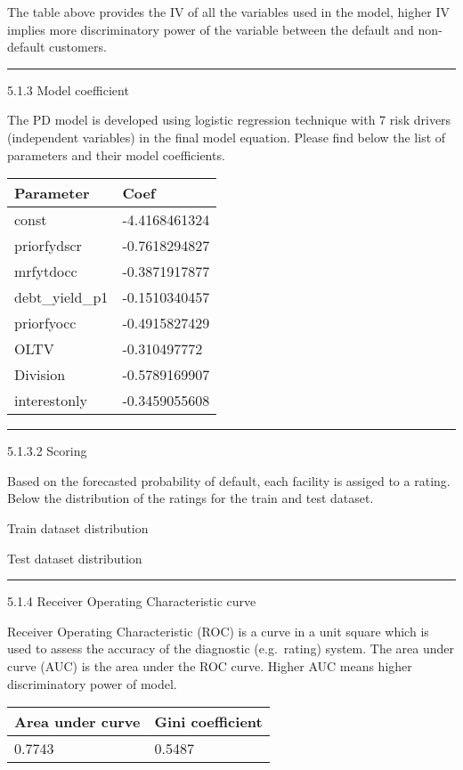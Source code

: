 The table above provides the IV of all the variables used in the model,
higher IV implies more discriminatory power of the variable between the
default and non-default customers.

\begin{center}\rule{0.5\linewidth}{\linethickness}\end{center}

5.1.3 Model coefficient

The PD model is developed using logistic regression technique with 7
risk drivers (independent variables) in the final model equation. Please
find below the list of parameters and their model coefficients.

\begin{longtable}[]{@{}ll@{}}
\toprule
Parameter & Coef\tabularnewline
\midrule
\endhead
const & -4.4168461324\tabularnewline
priorfydscr & -0.7618294827\tabularnewline
mrfytdocc & -0.3871917877\tabularnewline
debt\_yield\_p1 & -0.1510340457\tabularnewline
priorfyocc & -0.4915827429\tabularnewline
OLTV & -0.310497772\tabularnewline
Division & -0.5789169907\tabularnewline
interestonly & -0.3459055608\tabularnewline
\bottomrule
\end{longtable}

\begin{center}\rule{0.5\linewidth}{\linethickness}\end{center}

5.1.3.2 Scoring

Based on the forecasted probability of default, each facility is assiged
to a rating. Below the distribution of the ratings for the train and
test dataset.

Train dataset distribution

Test dataset distribution

\begin{center}\rule{0.5\linewidth}{\linethickness}\end{center}

5.1.4 Receiver Operating Characteristic curve

Receiver Operating Characteristic (ROC) is a curve in a unit square
which is used to assess the accuracy of the diagnostic (e.g.~rating)
system. The area under curve (AUC) is the area under the ROC curve.
Higher AUC means higher discriminatory power of model.

\begin{longtable}[]{@{}ll@{}}
\toprule
Area under curve & Gini coefficient\tabularnewline
\midrule
\endhead
0.7743 & 0.5487\tabularnewline
\bottomrule
\end{longtable}

